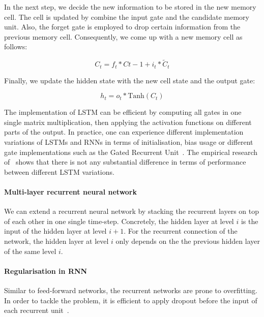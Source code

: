 In the next step, we decide the new information to be stored in the new memory cell. The cell is updated by combine the input gate and the candidate memory unit. Also, the forget gate is employed to drop certain information from the previous memory cell. Consequently, we come up with a new memory cell as follows:

\begin{equation}
C_t = f_t * C{t-1} + i_t * \tilde{C}_t
\label{eq:lstm2}
\end{equation}

Finally, we update the hidden state with the new cell state and the output gate:

\begin{equation}
h_t = o_t * \text{Tanh}(C_t)
\label{eq:lstm3}
\end{equation}

The implementation of LSTM can be efficient by computing all gates in one single matrix multiplication, then applying the activation functions on different parts of the output. In practice, one can experience different implementation variations of LSTMs and RNNs in terms of initialisation, bias usage or different gate implementations such as the Gated Recurrent Unit~\cite{cho2014learning}. The empirical research of~\cite{zaremba2015empirical} shows that there is not any substantial difference in terms of performance between different LSTM variations.

\paragraph{Multi-layer recurrent neural network} We can extend a recurrent neural network by stacking the recurrent layers on top of each other in one single time-step. Concretely, the hidden layer at level $i$ is the input of the hidden layer at level $i+1$. For the recurrent connection of the network, the hidden layer at level $i$ only depends on the the previous hidden layer of the same level $i$. 

\paragraph{Regularisation in RNN} Similar to feed-forward networks, the recurrent networks are prone to overfitting. In order to tackle the problem, it is efficient to apply dropout before the input of each recurrent unit~\cite{zaremba2014recurrent,pham2014dropout}. 

